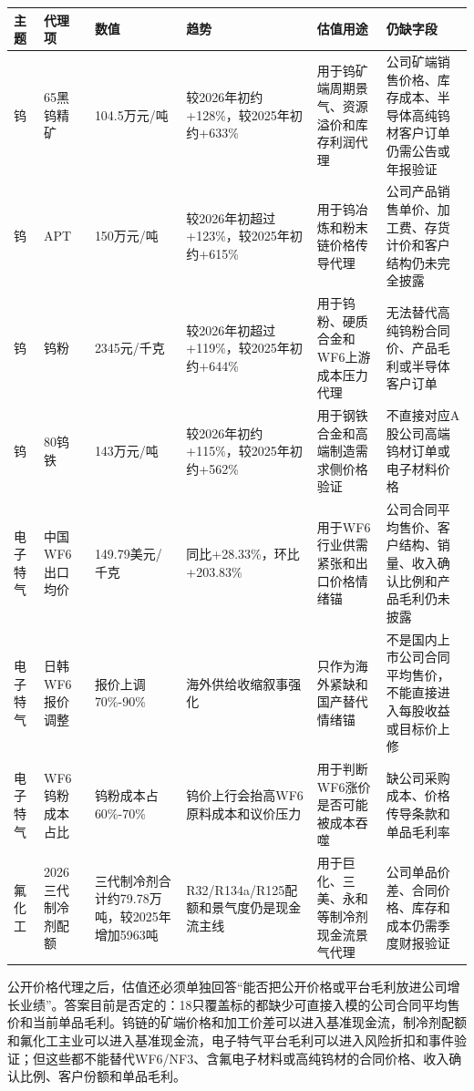 \begin{exhibitbox}[公开价格代理进入估值的边界]
\footnotesize
\begin{tabularx}{\exhibitboxwidth}{L{1.0cm} L{1.7cm} L{1.8cm} X X X}
\toprule
\textbf{主题} & \textbf{代理项} & \textbf{数值} & \textbf{趋势} & \textbf{估值用途} & \textbf{仍缺字段} \\
\midrule
钨 & 65黑钨精矿 & 104.5万元/吨 & 较2026年初约+128\%，较2025年初约+633\% & 用于钨矿端周期景气、资源溢价和库存利润代理 & 公司矿端销售价格、库存成本、半导体高纯钨材客户订单仍需公告或年报验证 \\
钨 & APT & 150万元/吨 & 较2026年初超过+123\%，较2025年初约+615\% & 用于钨冶炼和粉末链价格传导代理 & 公司产品销售单价、加工费、存货计价和客户结构仍未完全披露 \\
钨 & 钨粉 & 2345元/千克 & 较2026年初超过+119\%，较2025年初约+644\% & 用于钨粉、硬质合金和WF6上游成本压力代理 & 无法替代高纯钨粉合同价、产品毛利或半导体客户订单 \\
钨 & 80钨铁 & 143万元/吨 & 较2026年初约+115\%，较2025年初约+562\% & 用于钢铁合金和高端制造需求侧价格验证 & 不直接对应A股公司高端钨材订单或电子材料价格 \\
电子特气 & 中国WF6出口均价 & 149.79美元/千克 & 同比+28.33\%，环比+203.83\% & 用于WF6行业供需紧张和出口价格情绪锚 & 公司合同平均售价、客户结构、销量、收入确认比例和产品毛利仍未披露 \\
电子特气 & 日韩WF6报价调整 & 报价上调70\%-90\% & 海外供给收缩叙事强化 & 只作为海外紧缺和国产替代情绪锚 & 不是国内上市公司合同平均售价，不能直接进入每股收益或目标价上修 \\
电子特气 & WF6钨粉成本占比 & 钨粉成本占60\%-70\% & 钨价上行会抬高WF6原料成本和议价压力 & 用于判断WF6涨价是否可能被成本吞噬 & 缺公司采购成本、价格传导条款和单品毛利率 \\
氟化工 & 2026三代制冷剂配额 & 三代制冷剂合计约79.78万吨，较2025年增加5963吨 & R32/R134a/R125配额和景气度仍是现金流主线 & 用于巨化、三美、永和等制冷剂现金流景气代理 & 公司单品价差、合同价格、库存和成本仍需季度财报验证 \\
\bottomrule
\end{tabularx}
\end{exhibitbox}

公开价格代理之后，估值还必须单独回答“能否把公开价格或平台毛利放进公司增长业绩”。答案目前是否定的：18只覆盖标的都缺少可直接入模的公司合同平均售价和当前单品毛利。钨链的矿端价格和加工价差可以进入基准现金流，制冷剂配额和氟化工主业可以进入基准现金流，电子特气平台毛利可以进入风险折扣和事件验证；但这些都不能替代WF6/NF3、含氟电子材料或高纯钨材的合同价格、收入确认比例、客户份额和单品毛利。

